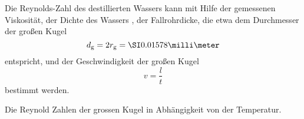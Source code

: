 Die Reynolds-Zahl des destillierten Wassers kann mit Hilfe der gemessenen Viskosität, der Dichte des Wassers \cite{TfCuP},
der Fallrohrdicke, die etwa dem Durchmesser der großen Kugel
\begin{equation*}
  d_\text{g} = 2 r_\text{g} = \grosseKugelDurchmesser
\end{equation*}
entspricht, und der Geschwindigkeit der großen Kugel
\begin{equation*}
  v = \frac{l}{t}
\end{equation*}
bestimmt werden.

\begin{table}
  \centering
  
  \caption{Die Reynold Zahlen der grossen Kugel in Abhängigkeit von der Temperatur.}
  \label{tab:grosse_kugel_reynold}
\end{table}